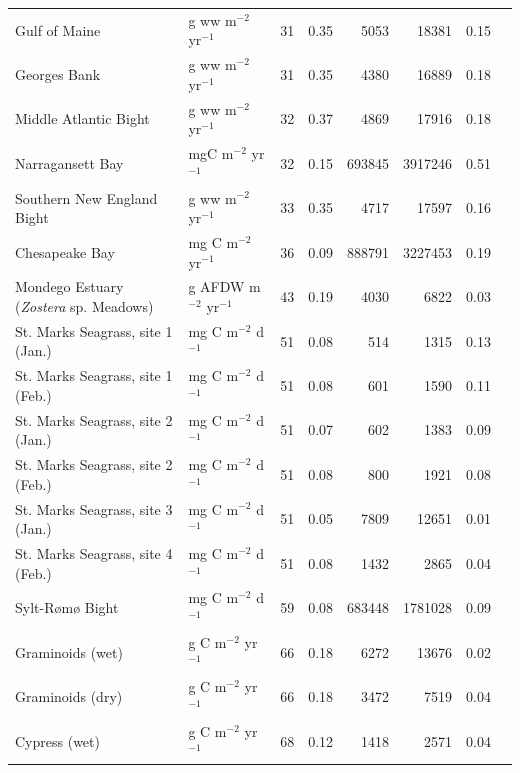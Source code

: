 \documentclass[article]{jss}
\begin{document}
\begin{table}[ht]
\begin{center}
\begin{tiny}
\begin{tabular}{llrrrrrr}
      Gulf of Maine & g ww m$^{-2}$ yr$^{-1}$  &  31 & 0.35 & 5053 & 18381 & 0.15 &   \citet{link08} \\
      Georges Bank & g ww m$^{-2}$ yr$^{-1}$  &  31 & 0.35 & 4380 & 16889 & 0.18 &  \citet{link08} \\
      Middle Atlantic Bight & g ww m$^{-2}$ yr$^{-1}$  &  32 & 0.37 & 4869 & 17916 & 0.18 &  \citet{link08} \\
      Narragansett Bay & mgC m$^{-2}$ yr$^{-1}$  &  32 & 0.15 & 693845 & 3917246 & 0.51 &  \citet{monaco97} \\
      Southern New England Bight & g ww m$^{-2}$ yr$^{-1}$  &  33 & 0.35 & 4717 & 17597 & 0.16 &  \citet{link08} \\
      Chesapeake Bay  & mg C m$^{-2}$ yr$^{-1}$  &  36 & 0.09 & 888791 & 3227453 & 0.19 &  \citet{baird89} \\
      Mondego Estuary (\textit{Zostera} sp. Meadows) & g AFDW m$^{−2}$ yr$^{−1}$ &  43 & 0.19 & 4030 & 6822 & 0.03 & \citet{patricio2006mass} \\
      St. Marks Seagrass, site 1 (Jan.) & mg C m$^{-2}$ d$^{-1}$  &  51 & 0.08 & 514 & 1315 & 0.13 &  \citet{baird98} \\
      St. Marks Seagrass, site 1 (Feb.) & mg C m$^{-2}$ d$^{-1}$  &  51 & 0.08 & 601 & 1590 & 0.11 &  \citet{baird98} \\
      St. Marks Seagrass, site 2 (Jan.) & mg C m$^{-2}$ d$^{-1}$  &  51 & 0.07 & 602 & 1383 & 0.09 &  \citet{baird98} \\
      St. Marks Seagrass, site 2 (Feb.) & mg C m$^{-2}$ d$^{-1}$  &  51 & 0.08 & 800 & 1921 & 0.08 &  \citet{baird98} \\
      St. Marks Seagrass, site 3 (Jan.) & mg C m$^{-2}$ d$^{-1}$  &  51 & 0.05 & 7809 & 12651 & 0.01 & \citet{baird98} \\
      St. Marks Seagrass, site 4 (Feb.) & mg C m$^{-2}$ d$^{-1}$  &  51 & 0.08 & 1432 & 2865 & 0.04 &  \citet{baird98} \\
      Sylt-R{\o}m{\o} Bight & mg C m$^{-2}$ d$^{-1}$  &  59 & 0.08 & 683448 & 1781028 & 0.09 &  \citet{baird04_sylt} \\
      Graminoids (wet) & g C m$^{-2}$ yr$^{-1}$  &  66 & 0.18 & 6272 & 13676 & 0.02 &  \citet{ulanowicz00_graminoids} \\
      Graminoids (dry) & g C m$^{-2}$ yr$^{-1}$  &  66 & 0.18 & 3472 & 7519 & 0.04 &   \citet{ulanowicz00_graminoids} \\
      Cypress (wet) & g C m$^{-2}$ yr$^{-1}$  &  68 & 0.12 & 1418 & 2571 & 0.04 &  \citet{ulanowicz97_cypress} \\

\end{tabular}
\end{tiny}
\end{center}
\end{table}
\end{document}
